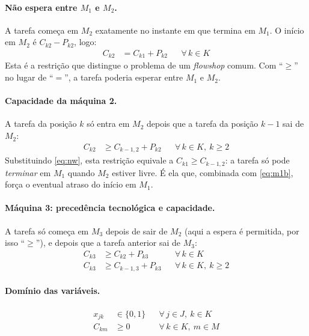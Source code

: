 \documentclass[11pt,a4paper]{article}
\begin{document}
\paragraph{Não espera entre $M_1$ e $M_2$.} A tarefa começa em $M_2$ exatamente
no instante em que termina em $M_1$. O início em $M_2$ é $C_{k2} - P_{k2}$, logo:
\begin{align}
  C_{k2} &= C_{k1} + P_{k2} && \forall\, k \in K \label{eq:nw}
\end{align}
Esta é a restrição que distingue o problema de um \emph{flowshop} comum. Com
``$\ge$'' no lugar de ``$=$'', a tarefa poderia esperar entre $M_1$ e $M_2$.

\paragraph{Capacidade da máquina 2.} A tarefa da posição $k$ só entra em $M_2$
depois que a tarefa da posição $k-1$ sai de $M_2$:
\begin{align}
  C_{k2} &\ge C_{k-1,2} + P_{k2} && \forall\, k \in K,\ k \ge 2 \label{eq:m2}
\end{align}
Substituindo \eqref{eq:nw}, esta restrição equivale a $C_{k1} \ge C_{k-1,2}$: a
tarefa só pode \emph{terminar} em $M_1$ quando $M_2$ estiver livre. É ela que,
combinada com \eqref{eq:m1b}, força o eventual atraso do início em $M_1$.

\paragraph{Máquina 3: precedência tecnológica e capacidade.} A tarefa só começa
em $M_3$ depois de sair de $M_2$ (aqui a espera é permitida, por isso
``$\ge$''), e depois que a tarefa anterior sai de $M_3$:
\begin{align}
  C_{k3} &\ge C_{k2} + P_{k3} && \forall\, k \in K \label{eq:m3a}\\
  C_{k3} &\ge C_{k-1,3} + P_{k3} && \forall\, k \in K,\ k \ge 2 \label{eq:m3b}
\end{align}

\paragraph{Domínio das variáveis.}
\begin{align}
  x_{jk} &\in \{0,1\} && \forall\, j \in J,\ k \in K \label{eq:dom1}\\
  C_{km} &\ge 0 && \forall\, k \in K,\ m \in M \label{eq:dom2}
\end{align}
\end{document}
